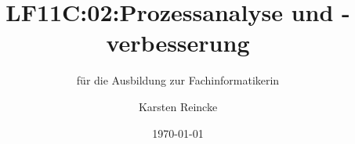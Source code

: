 \documentclass[]{beamer}
\title{LF11C:02:Prozessanalyse und -verbesserung}
\subtitle{für die Ausbildung zur Fachinformatikerin}
\institute[GS-LDK]{Gewerbliche Schulen Dillenburg}
\author{Karsten Reincke}
\date{\today}
\def\cfgGl{../../../cfg.gl/}
\begin{document}

\begin{frame}
  \titlepage

  
\end{frame}






\logo{}
\newpage



%
\end{document}
